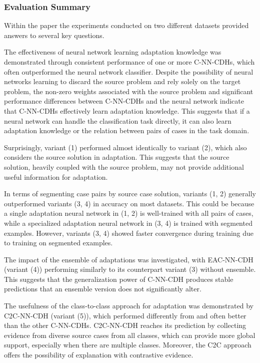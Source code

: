 \documentclass[a4paper, 12pt]{report}
\begin{document}
\subsubsection{Evaluation Summary}

Within the paper \cite{ye2021learning} the experiments conducted on two different datasets provided answers to several key questions.

The effectiveness of neural network learning adaptation knowledge was demonstrated through consistent performance of one or more C-NN-CDHs, 
which often outperformed the neural network classifier. Despite the possibility of neural networks learning to discard the source problem and rely solely on the target problem, 
the non-zero weights associated with the source problem and significant performance differences between C-NN-CDHs and the neural network indicate that C-NN-CDHs effectively learn adaptation knowledge. 
This suggests that if a neural network can handle the classification task directly, it can also learn adaptation knowledge or the relation between pairs of cases in the task domain.

Surprisingly, variant (1) performed almost identically to variant (2), 
which also considers the source solution in adaptation. 
This suggests that the source solution, heavily coupled with the source problem, may not provide additional useful information for adaptation.

In terms of segmenting case pairs by source case solution, variants (1, 2) generally outperformed variants (3, 4) in accuracy on most datasets. 
This could be because a single adaptation neural network in (1, 2) is well-trained with all pairs of cases, while a specialized adaptation neural network in (3, 4) is trained with segmented examples. 
However, variants (3, 4) showed faster convergence during training due to training on segmented examples.

The impact of the ensemble of adaptations was investigated, with EAC-NN-CDH (variant (4)) performing similarly to its counterpart variant (3) without ensemble. 
This suggests that the generalization power of C-NN-CDH produces stable predictions that an ensemble version does not significantly alter.

The usefulness of the class-to-class approach for adaptation was demonstrated by C2C-NN-CDH (variant (5)), which performed differently from and often better than the other C-NN-CDHs. 
C2C-NN-CDH reaches its prediction by collecting evidence from diverse source cases from all classes, 
which can provide more global support, especially when there are multiple classes. Moreover, 
the C2C approach offers the possibility of explanation with contrastive evidence.
\end{document}
